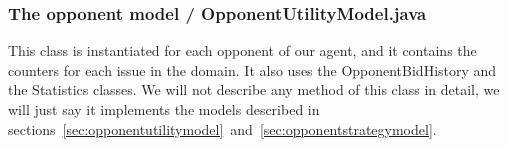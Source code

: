 \subsubsection{The opponent model / OpponentUtilityModel.java}
This class is instantiated for each opponent of our agent, and it contains the counters for each issue in the domain. It also uses the OpponentBidHistory and the Statistics classes. We will not describe any method of this class in detail, we will just say it implements the models described in sections~\ref{sec:opponentutilitymodel}~and~\ref{sec:opponentstrategymodel}.